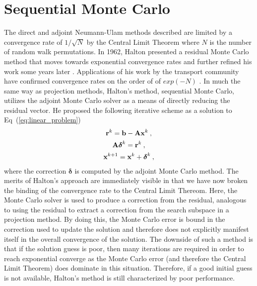 \section{Sequential Monte Carlo}
\label{sec:sequential_mc}
The direct and adjoint Neumann-Ulam methods described are limited by a
convergence rate of $1/\sqrt{N}$ by the Central Limit Theorem where
$N$ is the number of random walk permutations. In 1962, Halton
presented a residual Monte Carlo method that moves towards exponential
convergence rates \citep{halton_sequential_1962} and further refined
his work some years later \citep{halton_sequential_1994}. Applications
of his work by the transport community have confirmed convergence
rates on the order of of $exp(-N)$ \citep{evans_residual_2003}. In
much the same way as projection methods, Halton's method, sequential
Monte Carlo, utilizes the adjoint Monte Carlo solver as a means of
directly reducing the residual vector. He proposed the following
iterative scheme as a solution to Eq~(\ref{eq:linear_problem})\:
\begin{subequations}
  \begin{gather}
    \mathbf{r}^k = \mathbf{b} - \mathbf{A}\mathbf{x}^k\:,\\  
    \mathbf{A}\boldsymbol{\delta}^{k} = \mathbf{r}^{k}\:,\\
    \mathbf{x}^{k+1} = \mathbf{x}^k + \boldsymbol{\delta}^{k}\:,
  \end{gather}
  \label{eq:sequential_monte_carlo}
\end{subequations}
where the correction $\boldsymbol{\delta}$ is computed by the adjoint
Monte Carlo method. The merits of Halton's approach are immediately
visible in that we have now broken the binding of the convergence rate
to the Central Limit Thereom. Here, the Monte Carlo solver is used to
produce a correction from the residual, analogous to using the
residual to extract a correction from the search subspace in a
projection method. By doing this, the Monte Carlo error is bound in
the correction used to update the solution and therefore does not
explicitly manifest itself in the overall convergence of the
solution. The downside of such a method is that if the solution guess
is poor, then many iterations are required in order to reach
exponential converge as the Monte Carlo error (and therefore the
Central Limit Theorem) does dominate in this situation. Therefore, if
a good initial guess is not available, Halton's method is still
characterized by poor performance.

